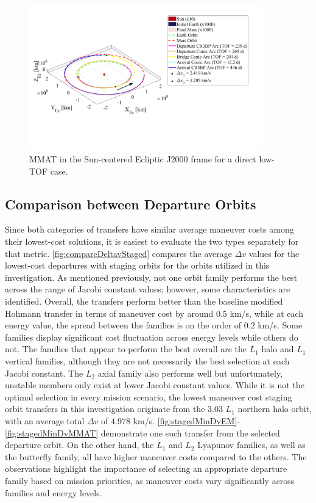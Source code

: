 \begin{figure}[H]
    \centering
    \includegraphics[width=0.9\textwidth]{figures/DirectMinTOFMMAT.pdf}
    \caption{MMAT in the Sun-centered Ecliptic J2000 frame for a direct low-TOF case.}
    \label{fig:directMinTOFMMAT}
\end{figure}

\subsection{Comparison between Departure Orbits}
Since both categories of transfers have similar average maneuver costs among their lowest-cost
solutions, it is easiest to evaluate the two types separately for that metric.
\cref{fig:compareDeltavStaged} compares the average $\Delta v$ values for the lowest-cost
departures with staging orbits for the orbits utilized in this investigation. As mentioned
previously, not one orbit family performs the best across the range of Jacobi constant values;
however, some characteristics are identified. Overall, the transfers perform better than the
baseline modified Hohmann transfer in terms of maneuver cost by around $0.5$ km/s, while at each
energy value, the spread between the families is on the order of $0.2$ km/s. Some families display
significant cost fluctuation across energy levels while others do not. The families that appear to
perform the best overall are the $L_{1}$ halo and $L_{1}$ vertical families, although they are not
necessarily the best selection at each Jacobi constant. The $L_{2}$ axial family also performs well
but unfortunately, unstable members only exist at lower Jacobi constant values. While it is not the
optimal selection in every mission scenario, the lowest maneuver cost staging orbit transfers in
this investigation originate from the $3.03$ $L_{1}$ northern halo orbit, with an average total
$\Delta v$ of $4.978$ km/s. \cref{fig:stagedMinDvEM}-\cref{fig:stagedMinDvMMAT} demonstrate one
such transfer from the selected departure orbit. On the other hand, the $L_{1}$ and $L_{2}$
Lyapunov families, as well as the butterfly family, all have higher maneuver costs compared to the
others. The observations highlight the importance of selecting an appropriate departure family
based on mission priorities, as maneuver costs vary significantly across families and energy
levels.

